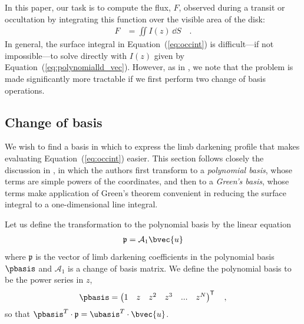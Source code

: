\documentclass[modern,trackchanges]{aastex63}
\begin{document}
In this paper, our task is to compute the flux, $F$, observed during a transit or occultation by
integrating this function over the visible area of the disk:
%
\begin{align}
    \label{eq:occint}
    F &=
    \iint I(z) \, \dd S \quad .
\end{align}
%
In general, the surface integral in Equation~(\ref{eq:occint}) is difficult---if not
impossible---to solve directly with $I(z)$ given by Equation~(\ref{eq:polynomialld_vec}).
However, as in \citet{starry}, we note that the problem
is made significantly more tractable if we first perform two change of basis
operations.

\subsection{Change of basis}
\label{sec:change_of_basis}
We wish to find a basis in which to express the limb darkening profile that
makes evaluating Equation~(\ref{eq:occint}) easier. This section follows
closely the discussion in \citet{starry}, in which the authors first transform
to a \emph{polynomial basis}, whose terms are simple powers of the coordinates,
and then to a \emph{Green's basis}, whose terms make application of Green's
theorem convenient in reducing the surface integral to a one-dimensional line
integral.

Let us define the transformation to the polynomial basis by the linear equation
%
\begin{align}
    \label{eq:pbasis}
    \mathfrak{p} = \mathcal{A}_1 \bvec{u}
\end{align}
%
where $\mathfrak{p}$ is the vector of limb darkening coefficients in the
polynomial basis $\pbasis$ and $\mathcal{A}_1$ is a change of basis matrix.
We define the polynomial basis to be the power series in $z$,
%
\begin{align}
    \label{eq:polybasis}
    \pbasis = \begin{pmatrix}
        1 & z & z^2 & z^3 & ... & z^N
    \end{pmatrix}^\mathsf{T} \quad,
\end{align}
so that $\pbasis^T \cdot \mathfrak{p} = \ubasis^T \cdot \bvec{u}$.

\end{document}
